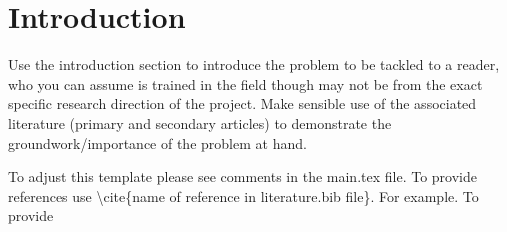 \section*{Introduction}
Use the introduction section to introduce the problem to be tackled to a reader, who you can assume is trained in the field though may not be from the exact specific research direction of the project. Make sensible use of the associated literature (primary and secondary articles) to demonstrate the groundwork/importance of the problem at hand.

To adjust this template please see comments in the main.tex file. To provide references use \textbackslash cite\{name of reference in literature.bib file\}. For example\cite{vogelpaper}. To provide 
